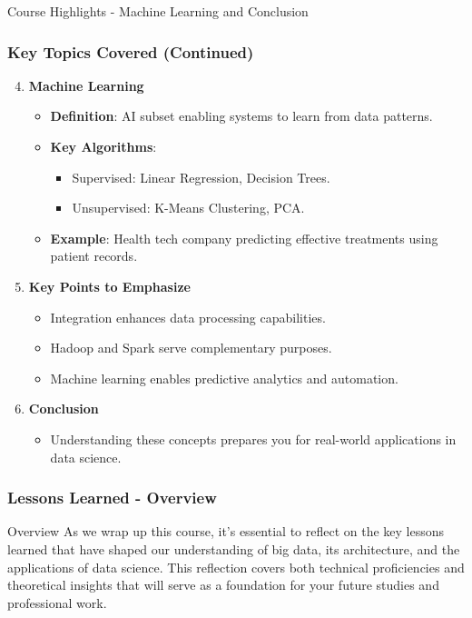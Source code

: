 \documentclass[aspectratio=169]{beamer}
\begin{document}
\begin{frame}[fragile]{Course Highlights - Machine Learning and Conclusion}
  \frametitle{Key Topics Covered (Continued)}
  
  \begin{enumerate}
    \setcounter{enumi}{3} %
    \item \textbf{Machine Learning}
    \begin{itemize}
      \item \textbf{Definition}: AI subset enabling systems to learn from data patterns.
      \item \textbf{Key Algorithms}:
      \begin{itemize}
        \item Supervised: Linear Regression, Decision Trees.
        \item Unsupervised: K-Means Clustering, PCA.
      \end{itemize}
      \item \textbf{Example}: Health tech company predicting effective treatments using patient records.
    \end{itemize}
    
    \item \textbf{Key Points to Emphasize}
    \begin{itemize}
      \item Integration enhances data processing capabilities.
      \item Hadoop and Spark serve complementary purposes.
      \item Machine learning enables predictive analytics and automation.
    \end{itemize}

    \item \textbf{Conclusion}
    \begin{itemize}
      \item Understanding these concepts prepares you for real-world applications in data science.
    \end{itemize}
  \end{enumerate}
\end{frame}

\begin{frame}[fragile]
    \frametitle{Lessons Learned - Overview}
    \begin{block}{Overview}
        As we wrap up this course, it’s essential to reflect on the key lessons learned that have shaped our understanding 
        of big data, its architecture, and the applications of data science. This reflection covers both technical proficiencies 
        and theoretical insights that will serve as a foundation for your future studies and professional work.
    \end{block}
\end{frame}
\end{document}
